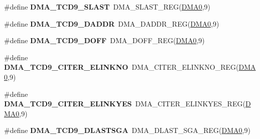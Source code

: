 \begin{DoxyCompactItemize}
\item 
\#define {\bfseries D\+M\+A\+\_\+\+T\+C\+D9\+\_\+\+S\+L\+A\+ST}~D\+M\+A\+\_\+\+S\+L\+A\+S\+T\+\_\+\+R\+EG(\hyperlink{group__DMA__Peripheral__Access__Layer_ga4103044f9ca209772f513dc694513ffb}{D\+M\+A0},9)\hypertarget{group__DMA__Register__Accessor__Macros_gabce4d11e5b7029e3466399882977542f}{}\label{group__DMA__Register__Accessor__Macros_gabce4d11e5b7029e3466399882977542f}

\item 
\#define {\bfseries D\+M\+A\+\_\+\+T\+C\+D9\+\_\+\+D\+A\+D\+DR}~D\+M\+A\+\_\+\+D\+A\+D\+D\+R\+\_\+\+R\+EG(\hyperlink{group__DMA__Peripheral__Access__Layer_ga4103044f9ca209772f513dc694513ffb}{D\+M\+A0},9)\hypertarget{group__DMA__Register__Accessor__Macros_ga9acd2cbb405259e09039ecddb5a0b278}{}\label{group__DMA__Register__Accessor__Macros_ga9acd2cbb405259e09039ecddb5a0b278}

\item 
\#define {\bfseries D\+M\+A\+\_\+\+T\+C\+D9\+\_\+\+D\+O\+FF}~D\+M\+A\+\_\+\+D\+O\+F\+F\+\_\+\+R\+EG(\hyperlink{group__DMA__Peripheral__Access__Layer_ga4103044f9ca209772f513dc694513ffb}{D\+M\+A0},9)\hypertarget{group__DMA__Register__Accessor__Macros_ga1a52f2942d7c84c64a15aaa7d8d989ec}{}\label{group__DMA__Register__Accessor__Macros_ga1a52f2942d7c84c64a15aaa7d8d989ec}

\item 
\#define {\bfseries D\+M\+A\+\_\+\+T\+C\+D9\+\_\+\+C\+I\+T\+E\+R\+\_\+\+E\+L\+I\+N\+K\+NO}~D\+M\+A\+\_\+\+C\+I\+T\+E\+R\+\_\+\+E\+L\+I\+N\+K\+N\+O\+\_\+\+R\+EG(\hyperlink{group__DMA__Peripheral__Access__Layer_ga4103044f9ca209772f513dc694513ffb}{D\+M\+A0},9)\hypertarget{group__DMA__Register__Accessor__Macros_ga058c1b0e7625a041c6fff963a6de5af9}{}\label{group__DMA__Register__Accessor__Macros_ga058c1b0e7625a041c6fff963a6de5af9}

\item 
\#define {\bfseries D\+M\+A\+\_\+\+T\+C\+D9\+\_\+\+C\+I\+T\+E\+R\+\_\+\+E\+L\+I\+N\+K\+Y\+ES}~D\+M\+A\+\_\+\+C\+I\+T\+E\+R\+\_\+\+E\+L\+I\+N\+K\+Y\+E\+S\+\_\+\+R\+EG(\hyperlink{group__DMA__Peripheral__Access__Layer_ga4103044f9ca209772f513dc694513ffb}{D\+M\+A0},9)\hypertarget{group__DMA__Register__Accessor__Macros_ga0d2e7773109a62951a808fab4a29515f}{}\label{group__DMA__Register__Accessor__Macros_ga0d2e7773109a62951a808fab4a29515f}

\item 
\#define {\bfseries D\+M\+A\+\_\+\+T\+C\+D9\+\_\+\+D\+L\+A\+S\+T\+S\+GA}~D\+M\+A\+\_\+\+D\+L\+A\+S\+T\+\_\+\+S\+G\+A\+\_\+\+R\+EG(\hyperlink{group__DMA__Peripheral__Access__Layer_ga4103044f9ca209772f513dc694513ffb}{D\+M\+A0},9)\hypertarget{group__DMA__Register__Accessor__Macros_ga0ec6976994ee346eac1875e848eb5468}{}\label{group__DMA__Register__Accessor__Macros_ga0ec6976994ee346eac1875e848eb5468}


\end{DoxyCompactItemize}
